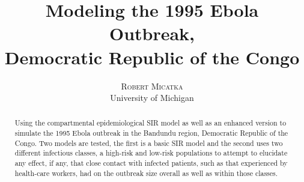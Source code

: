 \documentclass[twoside]{article}
\title{\vspace{-15mm}\fontsize{14pt}{12pt}\selectfont\textbf{Modeling the 1995 Ebola Outbreak, \\Democratic Republic of the Congo}} %
\author{
\large
\textsc{Robert Micatka}\\ %
\normalsize University of Michigan \\ %
}
\begin{document}
\maketitle 

\date{}


\begin{abstract}

	Using the compartmental epidemiological SIR model as well as an enhanced version to simulate the 1995 Ebola outbreak in
	 the Bandundu region, Democratic Republic of the Congo. Two models are tested, the first is a basic SIR model and the
	 second uses two different infectious classes, a high-risk and low-risk populations to attempt to elucidate any effect, if any,
	that close contact with infected patients, such as that experienced by health-care workers, had on the 
	outbreak size overall as well as within those classes.
 
\end{abstract}

\end{document}
